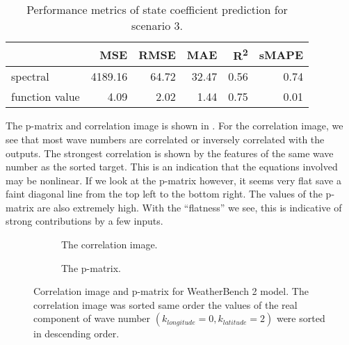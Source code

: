 \begin{table}[H]
  \caption{Performance metrics of state coefficient prediction for scenario 3.}\label{table:sc3_test_state_metrics}
  \centering
  \begin{tabular}{lrrrrr}
    \toprule
                   & MSE     & RMSE  & MAE   & R\textsuperscript{2}   & sMAPE \\
    \midrule
    spectral       & 4189.16 & 64.72 & 32.47 & 0.56 & 0.74  \\
    function value & 4.09    & 2.02  & 1.44  & 0.75 & 0.01  \\
    \bottomrule
  \end{tabular}
\end{table}
The p-matrix and correlation image is shown in . For the correlation image, we see that most wave numbers are correlated or inversely correlated with the outputs. The strongest correlation is shown by the features of the same wave number as the sorted target. This is an indication that the equations involved may be nonlinear. If we look at the p-matrix however, it seems very flat save a faint diagonal line from the top left to the bottom right. The values of the p-matrix are also extremely high. With the \enquote{flatness} we see, this is indicative of strong contributions by a few inputs.

\begin{figure}[H]
  \centering
  \begin{subfigure}{0.49\linewidth}
    \begin{adjustbox}{width=\linewidth}
      
    \end{adjustbox}
    \caption{The correlation image.}\label{fig:sc3_ci}
  \end{subfigure}
  \begin{subfigure}{0.49\linewidth}
    \begin{adjustbox}{width=\linewidth}
      
    \end{adjustbox}
    \caption{The p-matrix.}\label{fig:sc3_pm}
  \end{subfigure}
  \caption{Correlation image and p-matrix for WeatherBench 2 model. The correlation image was sorted same order the values of the real component of wave number \((k_{longitude}=0, k_{latitude}=2)\) were sorted in descending order.}\label{fig:sc3_interpretation}
\end{figure}

